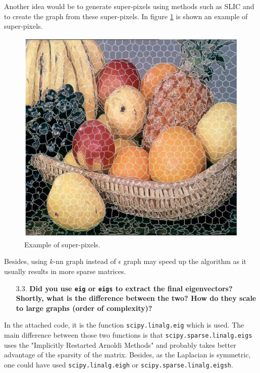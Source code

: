 \documentclass[a4paper, 11pt]{article}
\begin{document}
    Another idea would be to generate super-pixels using methods such as SLIC and to create the graph from these super-pixels. In figure \ref{fig:super-pixels} is shown an example of super-pixels.
    
    \begin{figure}[!ht]
        \centering
        \includegraphics[scale=0.65]{images/super_pixels.jpg}
        \caption{Example of super-pixels.}
        \label{fig:super-pixels}
    \end{figure}
    
    Besides, using $k$-nn graph instead of $\epsilon$ graph may speed up the algorithm as it usually results in more sparse matrices.

\begin{itemize}
    \item[3.3.] \textbf{Did you use \texttt{eig} or \texttt{eigs} to extract the final eigenvectors? Shortly, what is the difference between the two? How do they scale to large graphs (order of complexity)?}
\end{itemize}
    
    In the attached code, it is the function \texttt{scipy.linalg.eig} which is used. The main difference between those two functions is that \texttt{scipy.sparse.linalg.eigs} uses the "Implicitly Restarted Arnoldi Methods" and probably takes better advantage of the sparsity of the matrix. Besides, as the Laplacian is symmetric, one could have used \texttt{scipy.linalg.eigh} or \texttt{scipy.sparse.linalg.eigsh}.
\end{document}
